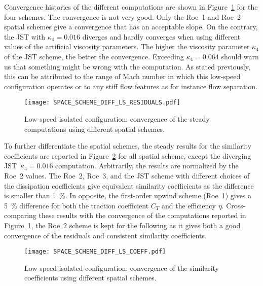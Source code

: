 Convergence histories of the different computations are shown 
in Figure~\ref{fig:dream_ls_space_scheme_residual}
for the four schemes. The convergence is not 
very good. Only the Roe~1 and Roe~2 spatial schemes give 
a convergence that has an acceptable slope. On the contrary,
the JST with $\kappa_4 = 0.016$ diverges and hardly converges
when using different values of the artificial viscosity
parameters. The higher the
viscosity parameter $\kappa_4$ of the JST scheme, the better
the convergence. Exceeding $\kappa_4 = 0.064$ should
warn us that something might be wrong with the computation.
As stated previously, this can be attributed to the range of Mach
number in which this low-speed configuration operates
or to any stiff flow features as for instance flow separation.
\begin{figure}[htp]
  \centering
  \texttt{[image: SPACE\_SCHEME\_DIFF\_LS\_RESIDUALS.pdf]}
  \caption{Low-speed isolated configuration: convergence of the
  steady computations using different spatial schemes.}
  \label{fig:dream_ls_space_scheme_residual}
\end{figure}

To further differentiate the spatial schemes, 
the steady results for the similarity coefficients are reported
in Figure~\ref{fig:dream_ls_space_scheme_coeff} for all spatial scheme, 
except the diverging JST~$\kappa_4 = 0.016$ computation.
Arbitrarily, the results are normalized by the Roe~2 values.
The Roe~2, Roe~3, and the JST scheme with different choices
of the dissipation coefficients give equivalent
similarity coefficients as the difference is smaller than 1~\%.
In opposite, the first-order upwind scheme (Roe~1) gives a 5~\%
difference for both the traction coefficient $C_T$ and the efficiency $\eta$.
Cross-comparing these results with the convergence of the computations
reported in Figure~\ref{fig:dream_ls_space_scheme_residual}, the Roe~2
scheme is kept for the following as it gives both a good convergence
of the residuals and consistent similarity coefficients.
\begin{figure}[htp]
  \centering
  \texttt{[image: SPACE\_SCHEME\_DIFF\_LS\_COEFF.pdf]}
  \caption{Low-speed isolated configuration: convergence of the 
  similarity coefficients using different spatial schemes.}
  \label{fig:dream_ls_space_scheme_coeff}
\end{figure}

